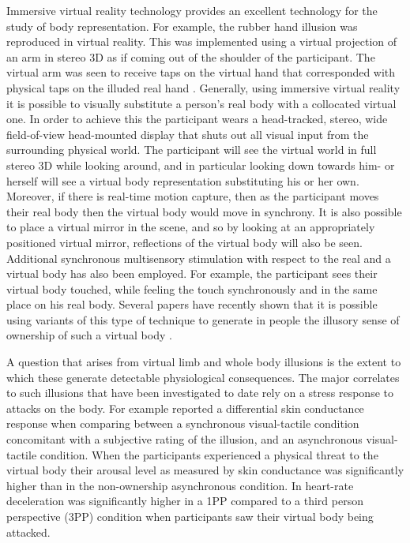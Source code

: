 \documentclass[
		twoside,openright,titlepage,numbers=noenddot,manychapters,
		headinclude,%
                footinclude=false,cleardoublepage=empty,
                BCOR=5mm,
		fontsize=11pt, %
                 enabledeprecatedfontcommands]{scrreprt}
\begin{document}
Immersive virtual reality technology provides an excellent technology for the study of body representation. For example, the rubber hand illusion was reproduced in virtual reality.  This was implemented using a virtual projection of an arm in stereo 3D as if coming out of the shoulder of the participant. The virtual arm was seen to receive taps on the virtual hand that corresponded with physical taps on the illuded real hand \cite{Slater2008, Slater2009b}. Generally, using immersive virtual reality it is possible to visually substitute a person’s real body with a collocated virtual one. In order to achieve this the participant wears a head-tracked, stereo, wide field-of-view head-mounted display that shuts out all visual input from the surrounding physical world.  The participant will see the virtual world in full stereo 3D while looking around, and in particular looking down towards him- or herself will see a virtual body representation substituting his or her own. Moreover, if there is real-time motion capture, then as the participant moves their real body then the virtual body would move in synchrony. It is also possible to place a virtual mirror in the scene, and so by looking at an appropriately positioned virtual mirror, reflections of the virtual body will also be seen. Additional synchronous multisensory stimulation with respect to the real and a virtual body has also been employed. For example, the participant sees their virtual body touched, while feeling the touch synchronously and in the same place on his real body. Several papers have recently shown that it is possible using variants of this type of technique to generate in people the illusory sense of ownership of such a virtual body \cite{Ehrsson2007d, Petkova2008, Lenggenhager2007, Slater2010, Slater2009b} . 

A question that arises from virtual limb and whole body illusions is the extent to which these generate detectable physiological consequences. The major correlates to such illusions that have been investigated to date rely on a stress response to attacks on the body. For example \cite{Petkova2008} reported a differential skin conductance response when comparing between a synchronous visual-tactile condition concomitant with a subjective rating of the illusion,  and an asynchronous visual-tactile condition. When the participants experienced a physical threat to the virtual body their arousal level as measured by skin conductance was significantly higher than in the non-ownership asynchronous condition. In \cite{Slater2010} heart-rate deceleration was significantly higher in a 1PP compared to a third person perspective (3PP) condition when participants saw their virtual body being attacked.
\end{document}
